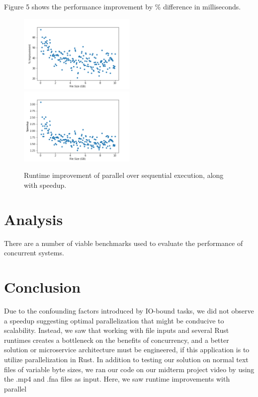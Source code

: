 \documentclass[conference]{IEEEtran}
\begin{document}
Figure 5 shows the performance improvement by \% difference in milliseconds.

\begin{figure}[h]
	\caption{Runtime improvement of parallel over sequential execution, along with speedup.}
	\centering
	\includegraphics[width=0.50\textwidth]{execution-improvement.png}
	\includegraphics[width=0.50\textwidth]{execution-speedup.png}
\end{figure}

\section{Analysis}
There are a number of viable benchmarks used to evaluate the performance of concurrent systems.

\section{Conclusion}
Due to the confounding factors introduced by IO-bound tasks, we did not observe a speedup suggesting optimal 
parallelization that might be conducive to scalability. Instead, we saw that working with file inputs and 
several Rust runtimes creates a bottleneck on the benefits of concurrency, and a better solution or microservice
architecture must be engineered, if this application is to utilize parallelization in Rust.
In addition to testing our solution on normal text files of variable byte sizes, we ran our code on our midterm 
project video by using the .mp4 and .fna files as input. Here, we saw runtime improvements with parallel
\end{document}
